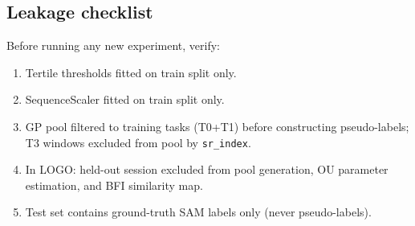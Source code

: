 \documentclass[sigconf,nonacm]{acmart}
\begin{document}
\subsection*{Leakage checklist}

Before running any new experiment, verify:
\begin{enumerate}[leftmargin=1.5em,topsep=2pt,itemsep=1pt]
  \item Tertile thresholds fitted on train split only.
  \item SequenceScaler fitted on train split only.
  \item GP pool filtered to training tasks (T0+T1) before constructing
        pseudo-labels; T3 windows excluded from pool by \texttt{sr\_index}.
  \item In LOGO: held-out session excluded from pool generation, OU parameter
        estimation, and BFI similarity map.
  \item Test set contains ground-truth SAM labels only (never pseudo-labels).
\end{enumerate}

\balance


\end{document}
